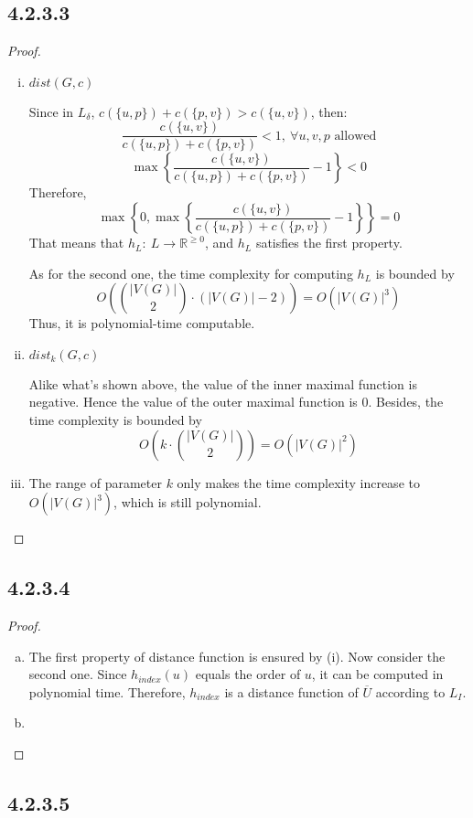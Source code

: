 \documentclass[twocolumn, 10.5pt]{article}
\begin{document}
	\subsection*{4.2.3.3}
	\begin{proof}
		\begin{enumerate}[(i)]
			\item $dist(G,c)$\par
			Since in $L_\delta$, $c(\{u,p\})+c(\{p,v\})>c(\{u,v\})$, then:
			\[
			\frac{c(\{u,v\})}{c(\{u,p\})+c(\{p,v\})}<1,\ \forall u,v,p\text{ allowed}
			\]
			\[
			\max\left\{	\frac{c(\{u,v\})}{c(\{u,p\})+c(\{p,v\})}-1\right\}<0
			\]
			Therefore,
			\[
			\max\left\{0,\max\left\{	\frac{c(\{u,v\})}{c(\{u,p\})+c(\{p,v\})}-1\right\}\right\}=0
			\]
			That means that $h_L:\ L\rightarrow \mathbb{R}^{\ge 0}$, and $h_L$ satisfies the first property.\par 
			As for the second one, the time complexity for computing $h_L$ is bounded by $$O\left(\binom{|V(G)|}{2}\cdot (|V(G)|-2)\right)=O(|V(G)|^3)$$
			Thus, it is polynomial-time computable.		
			\item $dist_k(G,c)$\par 
			Alike what's shown above, the value of the inner maximal function is negative. Hence the value of the outer maximal function is 0. Besides, the time complexity is bounded by $$O\left(k\cdot \binom{|V(G)|}{2}\right)=O(|V(G)|^2)$$
			\item The range of parameter $k$ only makes the time complexity increase to $O(|V(G)|^3)$, which is still polynomial.
		\end{enumerate}
	\end{proof}
	\subsection*{4.2.3.4}
	\begin{proof}
		\begin{enumerate}[a)]
			\item The first property of distance function is ensured by (i). Now consider the second one. Since $h_{index}(u)$ equals the order of $u$, it can be computed in polynomial time. Therefore, $h_{index}$ is a distance function of $\overline{U}$ according to $L_I$.
			\item 
		\end{enumerate}
	\end{proof}
	\subsection*{4.2.3.5}
\end{document}
